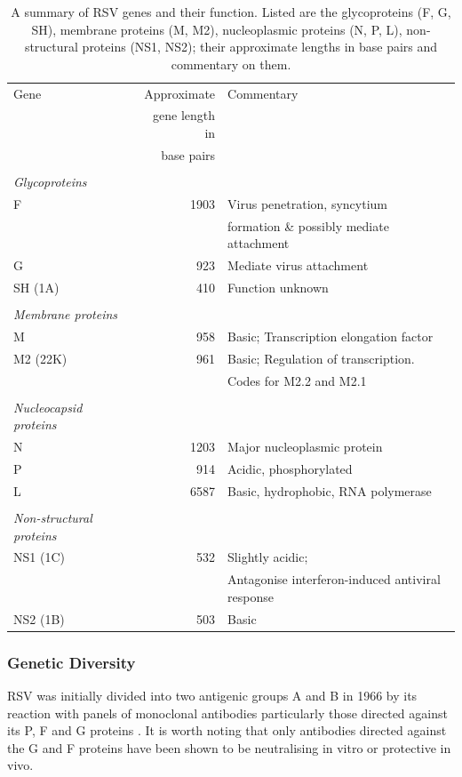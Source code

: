 \documentclass[10pt, a4paper]{article}
\begin{document}
\begin{table}[htbp]
\centering
\begin{tabular}{lrl}
Gene & Approximate & Commentary\\
 & gene length in & \\
 & base pairs & \\
\hline
 &  & \\
\emph{Glycoproteins} &  & \\
F & 1903 & Virus penetration, syncytium\\
 &  & formation \& possibly mediate attachment\\
G & 923 & Mediate virus attachment\\
SH (1A) & 410 & Function unknown\\
 &  & \\
\emph{Membrane proteins} &  & \\
M & 958 & Basic; Transcription elongation factor\\
M2 (22K) & 961 & Basic; Regulation of transcription.\\
 &  & Codes for M2.2 and M2.1\\
 &  & \\
\emph{Nucleocapsid proteins} &  & \\
N & 1203 & Major nucleoplasmic protein\\
P & 914 & Acidic, phosphorylated\\
L & 6587 & Basic, hydrophobic, RNA polymerase\\
 &  & \\
\emph{Non-structural proteins} &  & \\
NS1 (1C) & 532 & Slightly acidic;\\
 &  & Antagonise interferon-induced antiviral response\\
NS2 (1B) & 503 & Basic\\
\end{tabular}
\caption[Summary of RSV Genes]{\label{tab:org568b8ab}A summary of RSV genes and their function. Listed are the glycoproteins (F, G, SH), membrane proteins (M, M2), nucleoplasmic proteins (N, P, L), non-structural proteins (NS1, NS2); their approximate lengths in base pairs and commentary on them.}

\end{table}



\subsubsection{Genetic Diversity}
\label{sec:orga022406}
RSV was initially divided into two antigenic groups A and B in 1966 by its
reaction with panels of monoclonal antibodies particularly those directed
against its P, F and G proteins \cite{coatesAntigenicAnalysisRespiratory1966}.
It is worth noting that only antibodies directed against the G and F proteins
have been shown to be neutralising in vitro or protective in vivo. 
\end{document}
